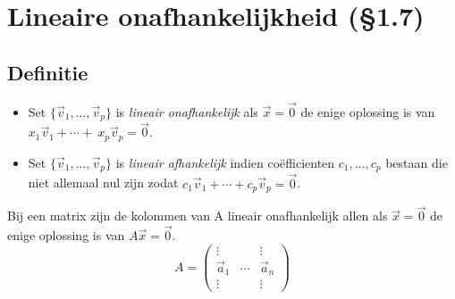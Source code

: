 \section{Lineaire onafhankelijkheid (\S 1.7)}

\subsection{Definitie}
\begin{itemize}
	\item Set $\{\vec{v}_1, \ldots, \vec{v}_p \}$ is \emph{lineair onafhankelijk}  als $\vec{x} = \vec{0}$ de enige oplossing is van $x_1 \vec{v}_1 + \cdots + \ x_p \vec{v}_p = \vec{0}$.
	\item Set $\{\vec{v}_1, \ldots, \vec{v}_p \}$ is \emph{lineair afhankelijk}  indien co\"efficienten $c_1, \ldots, c_p$ bestaan die niet allemaal nul zijn zodat $c_1\vec{v}_1 + \cdots + c_p\vec{v}_p = \vec{0}$.
\end{itemize}

Bij een matrix zijn de kolommen van A lineair onafhankelijk allen als $\vec{x} = \vec{0}$ de enige oplossing is van $A\vec{x} = \vec{0}$.
\[ A = \begin{pmatrix}
	\vdots & & \vdots \\
	\vec{a}_1 & \cdots & \vec{a}_n \\
	\vdots & & \vdots
\end{pmatrix} \]

